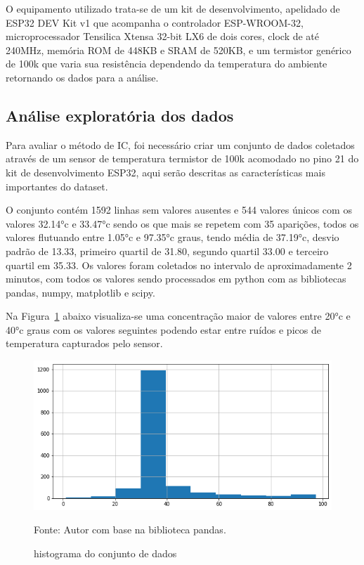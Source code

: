 O equipamento utilizado trata-se de um kit de desenvolvimento, apelidado de ESP32 DEV Kit v1 que acompanha o controlador ESP-WROOM-32, microprocessador Tensilica Xtensa 32-bit LX6 de dois cores, clock de até 240MHz, memória ROM de 448KB e SRAM de 520KB, e um termistor genérico de 100k que varia sua resistência dependendo da temperatura do ambiente retornando os dados para a análise.


\subsection{Análise exploratória dos dados}
Para avaliar o método de IC, foi necessário criar um conjunto de dados coletados através de um sensor de temperatura termistor de 100k acomodado no pino 21 do kit de desenvolvimento ESP32, aqui serão descritas as características mais importantes do dataset.

O conjunto contém 1592 linhas sem valores ausentes e 544 valores únicos com os valores \ang{32.14}c e \ang{33.47}c sendo os que mais se repetem com 35 aparições, todos os valores flutuando entre \ang{1.05}c e \ang{97.35}c graus, tendo média de \ang{37.19}c, desvio padrão de 13.33, primeiro quartil de 31.80, segundo quartil 33.00 e terceiro quartil em 35.33.
Os valores foram coletados no intervalo de aproximadamente 2 minutos, com todos os valores sendo processados em python com as bibliotecas pandas, numpy, matplotlib e scipy.


Na Figura~\ref{fig: hist} abaixo visualiza-se uma concentração maior de valores entre \ang{20}c e \ang{40}c graus com os valores seguintes podendo estar entre ruídos e picos de temperatura capturados pelo sensor. 

\begin{figure}[H]
	\centering
	\includegraphics[width=15cm]{imagens/sensores/hist.png}
	\caption{histograma do conjunto de dados}
	Fonte: Autor com base na biblioteca pandas.
	\label{fig: hist}
\end{figure}

